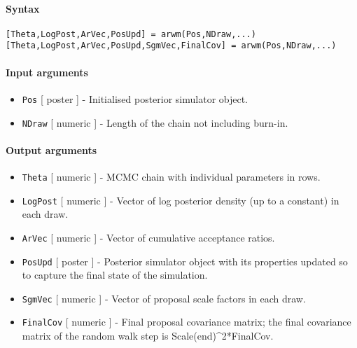 


	\paragraph{Syntax}\label{syntax}

\begin{verbatim}
[Theta,LogPost,ArVec,PosUpd] = arwm(Pos,NDraw,...)
[Theta,LogPost,ArVec,PosUpd,SgmVec,FinalCov] = arwm(Pos,NDraw,...)
\end{verbatim}

\paragraph{Input arguments}\label{input-arguments}

\begin{itemize}
\item
  \texttt{Pos} {[} poster {]} - Initialised posterior simulator object.
\item
  \texttt{NDraw} {[} numeric {]} - Length of the chain not including
  burn-in.
\end{itemize}

\paragraph{Output arguments}\label{output-arguments}

\begin{itemize}
\item
  \texttt{Theta} {[} numeric {]} - MCMC chain with individual parameters
  in rows.
\item
  \texttt{LogPost} {[} numeric {]} - Vector of log posterior density (up
  to a constant) in each draw.
\item
  \texttt{ArVec} {[} numeric {]} - Vector of cumulative acceptance
  ratios.
\item
  \texttt{PosUpd} {[} poster {]} - Posterior simulator object with its
  properties updated so to capture the final state of the simulation.
\item
  \texttt{SgmVec} {[} numeric {]} - Vector of proposal scale factors in
  each draw.
\item
  \texttt{FinalCov} {[} numeric {]} - Final proposal covariance matrix;
  the final covariance matrix of the random walk step is
  Scale(end)\^{}2*FinalCov.
\end{itemize}

